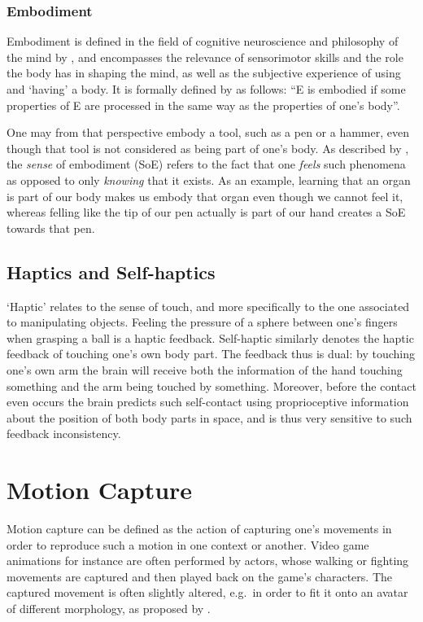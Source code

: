\subsubsection{Embodiment}
\label{sec:embodiment}
Embodiment is defined in the field of cognitive neuroscience and philosophy of the mind by \cite{blanke2009full,debarba2017embodiment}, and encompasses the relevance of sensorimotor skills and the role the body has in shaping the mind, as well as the subjective experience of using and `having' a body. It is formally defined by \cite{de2011embodiment} as follows: ``E is embodied if some properties of E are processed in the same way as the properties of one’s body''.

One may from that perspective embody a tool, such as a pen or a hammer, even though that tool is not considered as being part of one's body. As described by \cite{de2011embodiment}, the \textit{sense} of embodiment (SoE) refers to the fact that one \textit{feels} such phenomena as opposed to only \textit{knowing} that it exists. As an example, learning that an organ is part of our body makes us embody that organ even though we cannot feel it, whereas felling like the tip of our pen actually is part of our hand creates a SoE towards that pen.

\subsection{Haptics and Self-haptics}

`Haptic' relates to the sense of touch, and more specifically to the one associated to manipulating objects. Feeling the pressure of a sphere between one's fingers when grasping a ball is a haptic feedback. Self-haptic similarly denotes the haptic feedback of touching one's own body part. The feedback thus is dual: by touching one's own arm the brain will receive both the information of the hand touching something and the arm being touched by something. Moreover, before the contact even occurs the brain predicts such self-contact using proprioceptive information about the position of both body parts in space, and is thus very sensitive to such feedback inconsistency.

\section{Motion Capture}
\label{sec:mocap}
Motion capture can be defined as the action of capturing one's movements in order to reproduce such a motion in one context or another. Video game animations for instance are often performed by actors, whose walking or fighting movements are captured and then played back on the game's characters. The captured movement is often slightly altered, e.g.\ in order to fit it onto an avatar of different morphology, as proposed by \cite{molla2017egocentric}.

